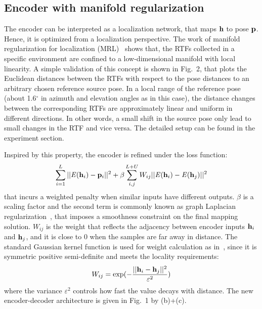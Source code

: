 \documentclass{article}
\begin{document}
\subsection{Encoder with manifold regularization}


The encoder can be interpreted as a localization network, that maps ${\bf h}$ to pose ${\bf p}$. Hence, it is optimized from a localization perspective. The work of manifold regularization for localization (MRL)~\cite{laufer2016mr} shows that, the RTFs collected in a specific environment are confined to a low-dimensional manifold with local linearity. A simple validation of this concept is shown in Fig.~2, that plots the Euclidean distances between the RTFs with respect to the pose distances to an arbitrary chosen reference source pose. In a local range of the reference pose (about 1.6$^\circ$ in azimuth and elevation angles as in this case), the distance changes between the corresponding RTFs are approximately linear and uniform in different directions. In other words, a small shift in the source pose only lead to small changes in the RTF and vice versa. The detailed setup can be found in the experiment section.

Inspired by this property, the encoder is refined under the loss function:
\begin{equation}\label{eq:lossmr}
\sum_{i=1}^{L}||\mathit{E}({\bf h}_i)-{\bf p}_i||^2 + \beta \sum_{i,j}^{L+U}W_{ij}||\mathit{E}({\bf h}_i)-\mathit{E}({\bf h}_j)||^2
\end{equation}
that incurs a weighted penalty when similar inputs have different outputs. $\beta$ is a scaling factor and the second term is commonly known as graph Laplacian regularization~\cite{Yang2016Revisiting}, that imposes a smoothness constraint on the final mapping solution. $W_{ij}$ is the weight that reflects the adjacency between encoder inputs ${\bf h}_i$ and ${\bf h}_j$, and it is close to 0 when the samples are far away in distance. The standard Gaussian kernel function is used for weight calculation as in~\cite{laufer2016mr}, since it is symmetric positive semi-definite and meets the locality requirements:
\begin{equation}\label{eq:wij}
  W_{ij} = \exp(-\frac{||{\bf h}_i-{\bf h}_j||^2}{\varepsilon^2})
\end{equation}
where the variance $\varepsilon^2$ controls how fast the value decays with distance. The new encoder-decoder architecture is given in Fig.~1 by (b)+(c).
\end{document}
